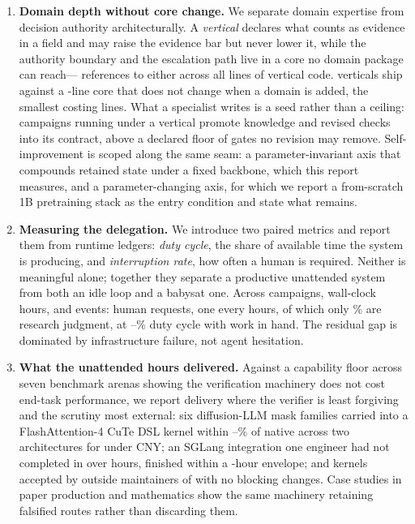 \begin{enumerate}[label=\textbf{C\arabic*.}]
  \item \textbf{Domain depth without core change.} We separate domain expertise from
    decision authority architecturally. A \emph{vertical} declares what counts as
    evidence in a field and may raise the evidence bar but never lower it, while the
    authority boundary and the escalation path live in a core no domain package can
    reach---\VerticalAuthorityRefs{} references to either across all
    \VerticalTotalLoc{} lines of vertical code. \VerticalCount{} verticals ship
    against a \VerticalCoreLoc{}-line core that does not change when a domain is
    added, the smallest costing \VerticalSmallest{} lines. What a specialist writes is
    a seed rather than a ceiling: campaigns running under a vertical promote knowledge
    and revised checks into its contract, above a declared floor of gates no revision
    may remove. Self-improvement is scoped along the same seam: a parameter-invariant
    axis that compounds retained state under a fixed backbone, which this report
    measures, and a parameter-changing axis, for which we report a from-scratch 1B
    pretraining stack as the entry condition and state what remains.

  \item \textbf{Measuring the delegation.} We introduce two paired metrics and report
    them from runtime ledgers: \emph{duty cycle}, the share of available time the
    system is producing, and \emph{interruption rate}, how often a human is required.
    Neither is meaningful alone; together they separate a productive unattended system
    from both an idle loop and a babysat one. Across \DutyCampaigns{} campaigns,
    \DutyWallHours{} wall-clock hours, and \DutyEvents{} events: \DutyInterruptions{}
    human requests, one every \DutyInterval{} hours, of which only
    \DutyJudgmentPercent\% are research judgment, at
    \DutyCycleLow--\DutyCycleHigh\% duty cycle with work in hand. The residual gap is
    dominated by infrastructure failure, not agent hesitation.

  \item \textbf{What the unattended hours delivered.} Against a capability floor
    across seven benchmark arenas showing the verification machinery does not cost
    end-task performance, we report delivery where the verifier is least forgiving
    and the scrutiny most external: six diffusion-LLM mask families carried into a
    FlashAttention-4 CuTe DSL kernel within
    \FlashDAGapLow--\FlashDAGapHigh\% of native across two architectures for under
    \FlashDACostCNY{} CNY; an SGLang integration one engineer had not completed in
    over \SGLangHumanHours{} hours, finished within a \SGLangArgusHours{}-hour
    envelope; and \FLAPRTotal{} kernels accepted by outside maintainers of
     with no blocking changes. Case studies in paper
    production and mathematics show the same machinery retaining falsified routes
    rather than discarding them.
\end{enumerate}

